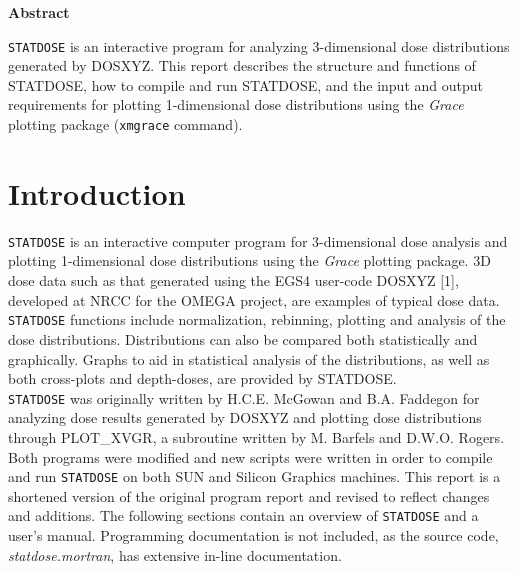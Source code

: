 \documentclass[12pt,twoside]{article}
\begin{document}
\setlength{\parindent}{0em}

\begin{center}
\begin{Large}
{\bf Abstract}
\end{Large}
\end{center}
\verb+STATDOSE+ is an interactive program for analyzing 3-dimensional dose
distributions generated by DOSXYZ. This report describes the structure and
functions of STATDOSE, how to compile and run STATDOSE, and the input and
output requirements for plotting 1-dimensional dose distributions using
the {\em Grace} plotting package ({\tt xmgrace} command).


\newpage

\tableofcontents

\newpage

\pagestyle{fancy}
\setcounter{page}{1}

\section{Introduction}

\verb+STATDOSE+ is an interactive computer program for 3-dimensional dose
analysis and plotting 1-dimensional dose distributions using the {\em
Grace} plotting package. 3D dose data such as that generated using the
EGS4 user-code DOSXYZ [1], developed at NRCC for the OMEGA project, are
examples of typical dose data. \verb+STATDOSE+ functions include normalization,
rebinning, plotting and analysis of the dose distributions. Distributions
can also be compared both statistically and graphically.  Graphs to aid in
statistical analysis of the distributions, as well as both cross-plots and
depth-doses, are provided by STATDOSE.\\

\verb+STATDOSE+ was originally written by H.C.E. McGowan and B.A. Faddegon for
analyzing dose results generated by DOSXYZ and plotting dose distributions
through PLOT\_XVGR, a subroutine written by M. Barfels and D.W.O. Rogers.
Both programs were modified and new scripts were written in order to
compile and run \verb+STATDOSE+ on both SUN and Silicon Graphics machines. This
report is a shortened version of the original program report and revised
to reflect changes and additions. The following sections contain an
overview of \verb+STATDOSE+ and a user's manual. Programming documentation is not
included, as the source code, {\em statdose.mortran}, has extensive
in-line documentation.
\end{document}
